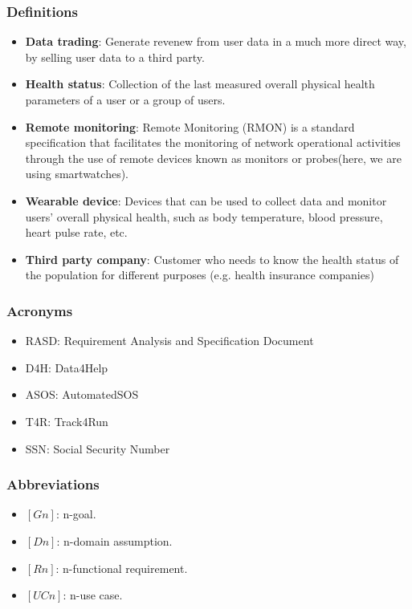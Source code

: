 \documentclass[12pt]{article}
\begin{document}
\subsubsection{Definitions}
\begin{itemize}
\item{\textbf{Data trading}}: Generate revenew from user data in a much more direct way, by selling user data to a third party.
\item{\textbf{Health status}}: Collection of the last measured overall physical health parameters of a user or a group of users.
\item{\textbf{Remote monitoring}}: Remote Monitoring (RMON) is a standard specification that facilitates the monitoring of network operational activities through the use of remote devices known as monitors or probes(here, we are using smartwatches).
\item{\textbf{Wearable device}}: Devices that can be used to collect data and monitor users' overall physical health, such as body temperature, blood pressure, heart pulse rate, etc.
\item{\textbf{Third party company}}: Customer who needs to know the health status of the population for different purposes (e.g. health insurance companies)
\end{itemize}

\subsubsection{Acronyms}
\begin{itemize}
\item{RASD}: Requirement Analysis and Specification Document
\item{D4H}: Data4Help
\item{ASOS}: AutomatedSOS
\item{T4R}: Track4Run
\item{SSN}: Social Security Number
\end{itemize}

\subsubsection{Abbreviations}
\begin{itemize}
\item $[Gn]$: n-goal. 
\item $[Dn]$: n-domain assumption. 
\item $[Rn]$: n-functional requirement. 
\item $[UCn]$: n-use case. 
\end{itemize}
\end{document}
